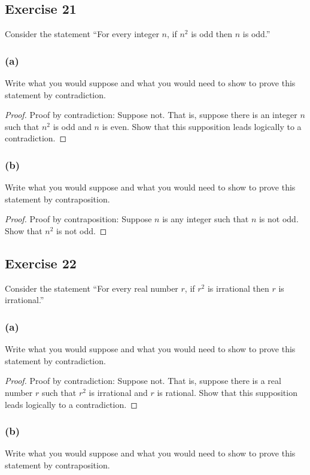 \documentclass[14pt]{extarticle}
\begin{document}
\subsection{Exercise 21}
Consider the statement “For every integer $n$, if $n^2$ is odd then $n$ is odd.”

\subsubsection{(a)}
Write what you would suppose and what you would need to show to prove this statement by contradiction.

\begin{proof}
Proof by contradiction: Suppose not. That is, suppose there is an integer $n$ such that $n^2$ is odd and $n$ is even. Show that this supposition leads logically to a contradiction.

\end{proof}

\subsubsection{(b)}
Write what you would suppose and what you would need to show to prove this statement by contraposition.

\begin{proof}
Proof by contraposition: Suppose $n$ is any integer such
that $n$ is not odd. Show that $n^2$ is not odd.
\end{proof}

\subsection{Exercise 22}
Consider the statement “For every real number $r$, if $r^2$ is irrational then $r$ is irrational.”

\subsubsection{(a)}
Write what you would suppose and what you would need to show to prove this statement by contradiction.

\begin{proof}
Proof by contradiction: Suppose not. That is, suppose there is a real number $r$ such that $r^2$ is irrational and $r$ is rational. Show that this supposition leads logically to a contradiction.
\end{proof}

\subsubsection{(b)}
Write what you would suppose and what you would need to show to prove this statement by contraposition.
\end{document}
